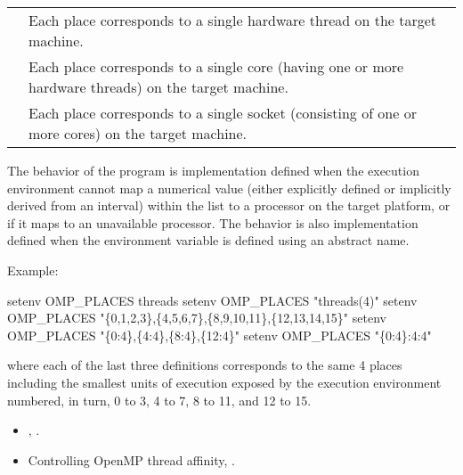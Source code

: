 \nolinenumbers
\renewcommand{\arraystretch}{1.5}
\tablelasttail{\hline}
\begin{supertabular}{p{1.5in} p{3.5in}}
 & Each place corresponds to a single hardware thread on the target machine.\\
 & Each place corresponds to a single core (having one or more hardware 
threads) on the target machine.\\
 & Each place corresponds to a single socket (consisting of one or more cores) 
on the target machine.\\
\end{supertabular}
\linenumbers

The behavior of the program is implementation defined when the execution environment 
cannot map a numerical value (either explicitly defined or implicitly derived from an 
interval) within the  list to a processor on the target platform, or if it maps 
to an unavailable processor. The behavior is also implementation defined when the 
 environment variable is defined using an abstract name.

\begin{samepage}
Example:
\begin{boxedcode}
setenv OMP\_PLACES threads
setenv OMP\_PLACES "threads(4)"
setenv OMP\_PLACES "\{0,1,2,3\},\{4,5,6,7\},\{8,9,10,11\},\{12,13,14,15\}"
setenv OMP\_PLACES "\{0:4\},\{4:4\},\{8:4\},\{12:4\}"
setenv OMP\_PLACES "\{0:4\}:4:4"
\end{boxedcode}
\end{samepage}

where each of the last three definitions corresponds to the same 4 places including the 
smallest units of execution exposed by the execution environment numbered, in turn, 0 
to 3, 4 to 7, 8 to 11, and 12 to 15. 

\crossreferences
\begin{itemize}
\item {}, .

\item Controlling OpenMP thread affinity, .
\end{itemize}










